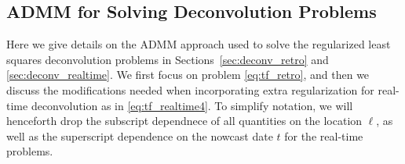 \documentclass[sts]{imsart}
\theoremstyle{plain}
\theoremstyle{definition}
\theoremstyle{remark}
\begin{document}
\begin{appendix}
	
\section{ADMM for Solving Deconvolution Problems}  
\label{app:tf_admm}

Here we give details on the ADMM approach used to solve the regularized least
squares deconvolution problems in Sections~\ref{sec:deconv_retro} and
\ref{sec:deconv_realtime}. We first focus on problem \eqref{eq:tf_retro}, and
then we discuss the modifications needed when incorporating extra regularization
for real-time deconvolution as in \eqref{eq:tf_realtime4}. To simplify notation,
we will henceforth drop the subscript dependnece of all quantities on the
location $\ell$, as well as the superscript dependence on the nowcast date $t$
for the real-time problems.


\end{appendix}
\end{document}
